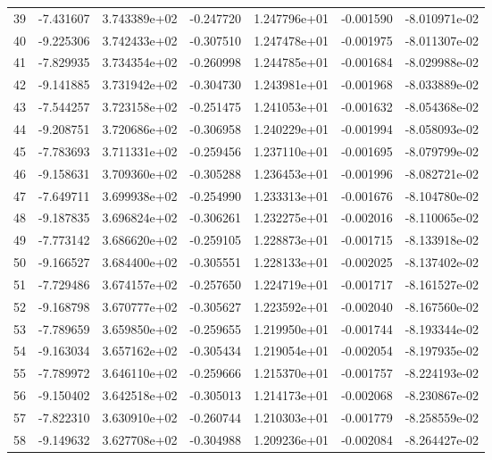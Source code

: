 \begin{tabular}{rrrrrrr}
  39 &  -7.431607 &  3.743389e+02 & -0.247720 &  1.247796e+01 &  -0.001590 & -8.010971e-02 \\
  40 &  -9.225306 &  3.742433e+02 & -0.307510 &  1.247478e+01 &  -0.001975 & -8.011307e-02 \\
  41 &  -7.829935 &  3.734354e+02 & -0.260998 &  1.244785e+01 &  -0.001684 & -8.029988e-02 \\
  42 &  -9.141885 &  3.731942e+02 & -0.304730 &  1.243981e+01 &  -0.001968 & -8.033889e-02 \\
  43 &  -7.544257 &  3.723158e+02 & -0.251475 &  1.241053e+01 &  -0.001632 & -8.054368e-02 \\
  44 &  -9.208751 &  3.720686e+02 & -0.306958 &  1.240229e+01 &  -0.001994 & -8.058093e-02 \\
  45 &  -7.783693 &  3.711331e+02 & -0.259456 &  1.237110e+01 &  -0.001695 & -8.079799e-02 \\
  46 &  -9.158631 &  3.709360e+02 & -0.305288 &  1.236453e+01 &  -0.001996 & -8.082721e-02 \\
  47 &  -7.649711 &  3.699938e+02 & -0.254990 &  1.233313e+01 &  -0.001676 & -8.104780e-02 \\
  48 &  -9.187835 &  3.696824e+02 & -0.306261 &  1.232275e+01 &  -0.002016 & -8.110065e-02 \\
  49 &  -7.773142 &  3.686620e+02 & -0.259105 &  1.228873e+01 &  -0.001715 & -8.133918e-02 \\
  50 &  -9.166527 &  3.684400e+02 & -0.305551 &  1.228133e+01 &  -0.002025 & -8.137402e-02 \\
  51 &  -7.729486 &  3.674157e+02 & -0.257650 &  1.224719e+01 &  -0.001717 & -8.161527e-02 \\
  52 &  -9.168798 &  3.670777e+02 & -0.305627 &  1.223592e+01 &  -0.002040 & -8.167560e-02 \\
  53 &  -7.789659 &  3.659850e+02 & -0.259655 &  1.219950e+01 &  -0.001744 & -8.193344e-02 \\
  54 &  -9.163034 &  3.657162e+02 & -0.305434 &  1.219054e+01 &  -0.002054 & -8.197935e-02 \\
  55 &  -7.789972 &  3.646110e+02 & -0.259666 &  1.215370e+01 &  -0.001757 & -8.224193e-02 \\
  56 &  -9.150402 &  3.642518e+02 & -0.305013 &  1.214173e+01 &  -0.002068 & -8.230867e-02 \\
  57 &  -7.822310 &  3.630910e+02 & -0.260744 &  1.210303e+01 &  -0.001779 & -8.258559e-02 \\
  58 &  -9.149632 &  3.627708e+02 & -0.304988 &  1.209236e+01 &  -0.002084 & -8.264427e-02 \\

\end{tabular}
